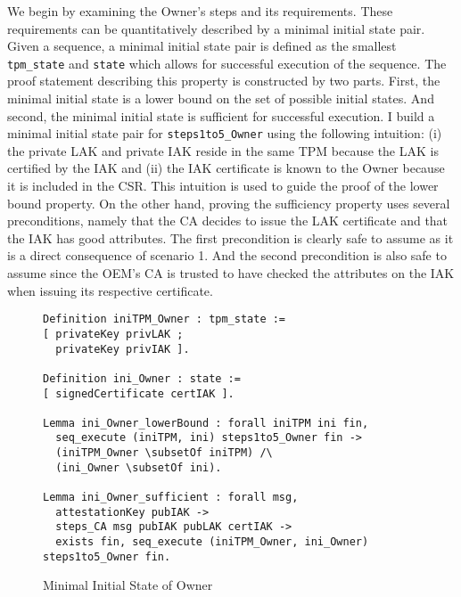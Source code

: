We begin by examining the Owner's steps and its requirements. These requirements can be quantitatively described by a minimal initial state pair. Given a sequence, a minimal initial state pair is defined as the smallest \verb|tpm_state| and \verb|state| which allows for successful execution of the sequence. The proof statement describing this property is constructed by two parts. First, the minimal initial state is a lower bound on the set of possible initial states. And second, the minimal initial state is sufficient for successful execution. I build a minimal initial state pair for \verb|steps1to5_Owner| using the following intuition: (i) the private LAK and private IAK reside in the same TPM because the LAK is certified by the IAK and (ii) the IAK certificate is known to the Owner because it is included in the CSR.  
This intuition is used to guide the proof of the lower bound property.
On the other hand, proving the sufficiency property uses several preconditions, namely that the CA decides to issue the LAK certificate and that the IAK has good attributes.
The first precondition is clearly safe to assume as it is a direct consequence of scenario 1.
And the second precondition is also safe to assume since the OEM's CA is trusted to have checked the attributes on the IAK when issuing its respective certificate.
\begin{figure}[h]
\begin{lstlisting}[language=Coq]
Definition iniTPM_Owner : tpm_state :=
[ privateKey privLAK ;
  privateKey privIAK ].

Definition ini_Owner : state :=
[ signedCertificate certIAK ].

Lemma ini_Owner_lowerBound : forall iniTPM ini fin,
  seq_execute (iniTPM, ini) steps1to5_Owner fin ->
  (iniTPM_Owner \subsetOf iniTPM) /\
  (ini_Owner \subsetOf ini).

Lemma ini_Owner_sufficient : forall msg,
  attestationKey pubIAK ->
  steps_CA msg pubIAK pubLAK certIAK ->
  exists fin, seq_execute (iniTPM_Owner, ini_Owner) steps1to5_Owner fin.
\end{lstlisting}
\caption{Minimal Initial State of Owner}
\end{figure}
